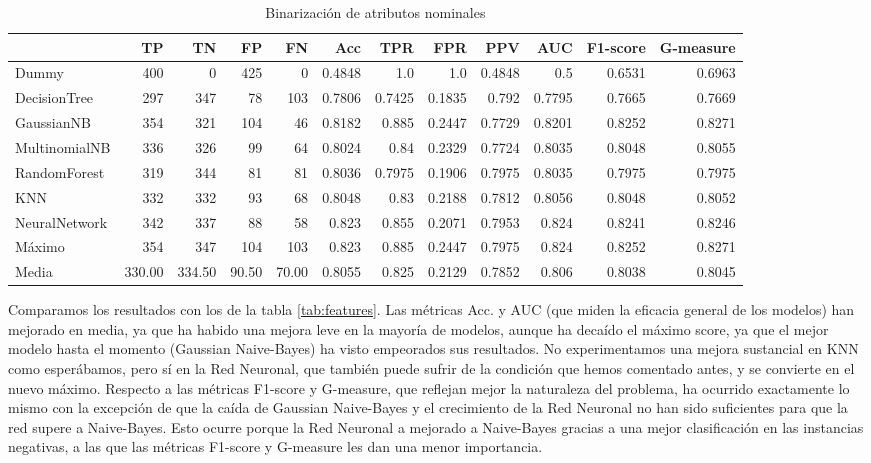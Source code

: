 \documentclass{article}
\begin{document}
\begin{table}[H]
\centering
\caption{Binarización de atributos nominales}
\label{tab:binarization}
\begin{tabular}{|lrrrrrrrrrrr|}
\hline
 & TP & TN & FP & FN & Acc & TPR & FPR & PPV & AUC & F1-score & G-measure\\ \hline
Dummy & 400 & 0 & 425 & 0 & 0.4848 & 1.0 & 1.0 & 0.4848 & 0.5 & 0.6531 & 0.6963\\
DecisionTree & 297 & 347 & 78 & 103 & 0.7806 & 0.7425 & 0.1835 & 0.792 & 0.7795 & 0.7665 & 0.7669\\
GaussianNB & 354 & 321 & 104 & 46 & 0.8182 & 0.885 & 0.2447 & 0.7729 & 0.8201 & 0.8252 & 0.8271\\
MultinomialNB & 336 & 326 & 99 & 64 & 0.8024 & 0.84 & 0.2329 & 0.7724 & 0.8035 & 0.8048 & 0.8055\\
RandomForest & 319 & 344 & 81 & 81 & 0.8036 & 0.7975 & 0.1906 & 0.7975 & 0.8035 & 0.7975 & 0.7975\\
KNN & 332 & 332 & 93 & 68 & 0.8048 & 0.83 & 0.2188 & 0.7812 & 0.8056 & 0.8048 & 0.8052\\
NeuralNetwork & 342 & 337 & 88 & 58 & 0.823 & 0.855 & 0.2071 & 0.7953 & 0.824 & 0.8241 & 0.8246\\ \hline
Máximo & 354 & 347 & 104 & 103 & 0.823 & 0.885 & 0.2447 & 0.7975 & 0.824 & 0.8252 & 0.8271\\
Media & 330.00 & 334.50 & 90.50 & 70.00 & 0.8055 & 0.825 & 0.2129 & 0.7852 & 0.806 & 0.8038 & 0.8045\\
\hline
\end{tabular}
\end{table}

Comparamos los resultados con los de la tabla \ref{tab:features}. Las
métricas Acc. y AUC (que miden la eficacia general de los modelos) han
mejorado en media, ya que ha habido una mejora leve en la mayoría de
modelos, aunque ha decaído el máximo score, ya que el mejor modelo
hasta el momento (Gaussian Naive-Bayes) ha visto empeorados sus
resultados. No experimentamos una mejora sustancial en KNN como
esperábamos, pero sí en la Red Neuronal, que también puede sufrir de
la condición que hemos comentado antes, y se convierte en el nuevo
máximo. Respecto a las métricas F1-score y G-measure, que reflejan
mejor la naturaleza del problema, ha ocurrido exactamente lo mismo con
la excepción de que la caída de Gaussian Naive-Bayes y el crecimiento
de la Red Neuronal no han sido suficientes para que la red supere a
Naive-Bayes. Esto ocurre porque la Red Neuronal a mejorado a
Naive-Bayes gracias a una mejor clasificación en las instancias
negativas, a las que las métricas F1-score y G-measure les dan una
menor importancia.
\end{document}
